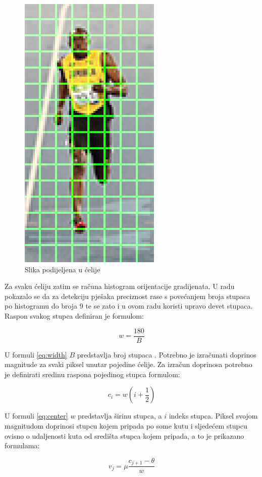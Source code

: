 \documentclass[times, utf8, zavrsni]{fer}
\begin{document}
\begin{figure}[htb]
	\centering
	\includegraphics[width=0.3\linewidth]{figures/hog-cells.png}
	\caption{Slika podijeljena u ćelije\protect\footnotemark}
	\label{fig:hogCells}
\end{figure}



Za svaku ćeliju zatim se računa histogram orijentacije gradijenata. U radu \citep{dalal2005histograms} pokazalo se da za detekciju pješaka preciznost rase s povećanjem broja stupaca po histogramu do broja 9 te se zato i u ovom radu koristi upravo devet stupaca. Raspon svakog stupca definiran je formulom:

\begin{equation}
	w = \frac{180}{B}
	\label{eq:width}
\end{equation}

U formuli \ref{eq:width} \(B\) predstavlja broj stupaca \citep{tomasi2012histograms}. Potrebno je izračunati doprinos magnitude za svaki piksel unutar pojedine ćelije. Za izračun doprinosa potrebno je definirati sredinu raspona pojedinog stupca formulom:

\begin{equation}
	c_i = w(i + \frac{1}{2})
	\label{eq:center}
\end{equation}

 U formuli \ref{eq:center} \(w\) predstavlja širinu stupca, a \(i\) indeks stupca. Piksel svojom magnitudom doprinosi stupcu kojem pripada po some kutu i sljedećem stupcu ovisno o udaljenosti kuta od središta stupca kojem pripada, a to je prikazano formulama: 
 
 \begin{equation}
	v_{j} = \mu \frac{c_{j + 1} - \theta}{w}
 	\label{eq:vote}
 \end{equation}
 
\end{document}
